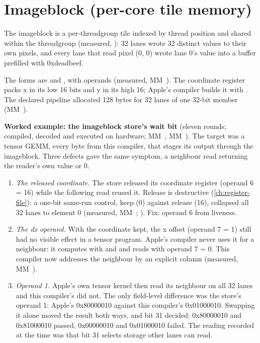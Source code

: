 \section{Imageblock (per-core tile memory)}\label{sec:imageblock-per-core-tile}

The imageblock is a per-threadgroup tile indexed by thread position and shared within the threadgroup (measured,
): 32 lanes wrote 32 distinct values to their own pixels, and every lane that read pixel
(0, 0) wrote lane 0's value into a buffer prefilled with 0xdeadbeef.

The forms are  and , with operands
 (measured,
MM~). The coordinate register packs x in its low 16 bits and y in its high 16; Apple's compiler builds it with
. The declared pipeline allocated 128 bytes for 32 lanes of one 32-bit member
(MM~).

\textbf{Worked example: the imageblock store's wait bit} (eleven rounds; compiled, decoded and executed on hardware;
MM~, MM~). The target was a tensor GEMM, every byte from this compiler, that stages its output through
the imageblock. Three defects gave the same symptom, a neighbour read returning the reader's own value or 0.

\begin{enumerate}
\def\labelenumi{\arabic{enumi}.}
\item \emph{The released coordinate.} The store released its coordinate register (operand 6 = 16) while the following read
  reused it. Release is destructive (\cref{ch:register-file}): a one-bit same-run control, keep (0) against release (16), collapsed
  all 32 lanes to element 0 (measured, MM~; ). Fix: operand 6 from liveness.
\item \emph{The dx operand.} With the coordinate kept, the x offset (operand 7 = 1) still had no visible effect in a tensor
  program. Apple's compiler never uses it for a neighbour: it computes  with  and  and reads with operand 7 = 0. This compiler now addresses the
  neighbour by an explicit column (measured, MM~).
\item \emph{Operand 1.} Apple's own tensor kernel then read its neighbour on all 32 lanes and this compiler's did not. The only
  field-level difference was the store's operand 1: Apple's 0x80000010 against this compiler's 0x01000010. Swapping it
  alone moved the result both ways, and bit 31 decided: 0x80000010 and 0x81000010 passed, 0x00000010 and 0x01000010
  failed. The reading recorded at the time was that bit 31 selects storage other lanes can read.
\end{enumerate}

